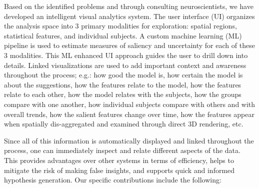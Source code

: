 Based on the identified problems and through consulting neuroscientists, we have developed an 
intelligent visual analytics system. The user interface (UI) organizes the analysis space into 3 primary modalities for exploration: spatial regions, statistical features, and individual subjects. A custom machine learning (ML) pipeline is used to estimate measures of saliency and uncertainty for each of these 3 modalities. 
This ML enhanced UI approach guides the user to drill down into details. Linked visualizations are used to add important context and awareness throughout the process; e.g.: how good the model is, how certain the model is about the suggestions, how the features relate to the model, how the features relate to each other, how the model relates with the subjects, how the groups compare with one another, how individual subjects compare with others and with overall trends, how the salient features change over time, how the features appear when spatially dis-aggregated and examined through direct 3D rendering, etc. 

Since all of this information is automatically displayed and linked throughout the process, one can immediately inspect and relate different aspects of the data. This provides advantages over other systems in terms of efficiency, helps to mitigate the risk of making false insights, and supports quick and informed hypothesis generation. Our specific contributions include the following:


